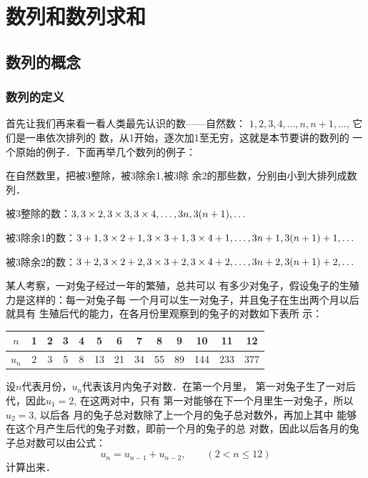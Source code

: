 \chapter{数列和数列求和}

\section{数列的概念}
\subsection{数列的定义}

首先让我们再来看一看人类最先认识的数——自然数：
$1,2,3,4,\ldots,n,n+1,\ldots$, 它们是一串依次排列的
数，从1开始，逐次加1至无穷，这就是本节要讲的数列的
一个原始的例子．下面再举几个数列的例子：

\begin{example}
    在自然数里，把被3整除，被3除余1,被3除
余2的那些数，分别由小到大排列成数列．
\end{example}

\begin{solution}
    被3整除的数：$3,3\times2,3\times3,3\times4,\ldots,3n,3(n+1),\ldots$

被3除余1的数：$3+1,3\times2+1,3\times3+1,3\times4+1,\ldots,3n+1,3(n+1)+1,\ldots$

被3除余2的数：$3+2,3\times2+2,3\times3+2,3\times4+2,\ldots , 3n+2,3(n+1) +2,\ldots$
\end{solution}

\begin{example}
    某人考察，一对兔子经过一年的繁殖，总共可以
有多少对兔子，假设兔子的生殖力是这样的：每一对兔子每
一个月可以生一对兔子，并且兔子在生出两个月以后就具有
生殖后代的能力，在各月份里观察到的兔子的对数如下表所
示：
\begin{center}
\begin{tabular}{c|cccccccccccc}
\hline
$n$&1&2&3&4&5&6&7&8&9&10&11&12\\
\hline
$u_n$&2&3&5&8&13&21&34&55&89&144&233&377\\
\hline
\end{tabular}
\end{center}

设$n$代表月份，$u_n$代表该月内兔子对数．在第一个月里，
第一对兔子生了一对后代，因此$u_1=2$, 在这两对中，只有
第一对能够在下一个月里生一对兔子，所以$u_2=3$, 以后各
月的兔子总对数除了上一个月的兔子总对数外，再加上其中
能够在这个月产生后代的兔子对数，即前一个月的兔子的总
对数，因此以后各月的兔子总对数可以由公式：
\[u_n=u_{n-1}+u_{n-2},\qquad (2<n\le 12)\]
计算出来．
\end{example}

